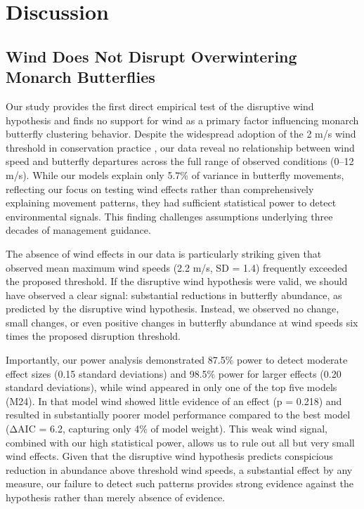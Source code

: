\section{Discussion}

\subsection{Wind Does Not Disrupt Overwintering Monarch Butterflies}

Our study provides the first direct empirical test of the disruptive wind hypothesis and finds no support for wind as a primary factor influencing monarch butterfly clustering behavior. Despite the widespread adoption of the 2 m/s wind threshold in conservation practice \autocite{Society2016_WFJMUMAD}, our data reveal no relationship between wind speed and butterfly departures across the full range of observed conditions (0--12 m/s). While our models explain only 5.7\% of variance in butterfly movements, reflecting our focus on testing wind effects rather than comprehensively explaining movement patterns, they had sufficient statistical power to detect environmental signals. This finding challenges assumptions underlying three decades of management guidance.

The absence of wind effects in our data is particularly striking given that observed mean maximum wind speeds (2.2 m/s, SD = 1.4) frequently exceeded the proposed threshold. If the disruptive wind hypothesis were valid, we should have observed a clear signal: substantial reductions in butterfly abundance, as predicted by the disruptive wind hypothesis. Instead, we observed no change, small changes, or even positive changes in butterfly abundance at wind speeds six times the proposed disruption threshold. 

Importantly, our power analysis demonstrated 87.5\% power to detect moderate effect sizes (0.15 standard deviations) and 98.5\% power for larger effects (0.20 standard deviations), while wind appeared in only one of the top five models (M24). In that model wind showed little evidence of an effect (p = 0.218) and resulted in substantially poorer model performance compared to the best model (ΔAIC = 6.2, capturing only 4\% of model weight). This weak wind signal, combined with our high statistical power, allows us to rule out all but very small wind effects. Given that the disruptive wind hypothesis predicts conspicious reduction in abundance above threshold wind speeds, a substantial effect by any measure, our failure to detect such patterns provides strong evidence against the hypothesis rather than merely absence of evidence.

